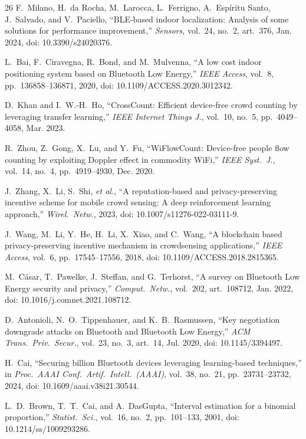 \documentclass[journal,10pt]{IEEEtran}
\begin{document}
\begin{thebibliography}{26}
 F.~Milano, H.~da Rocha, M.~Larocca, L.~Ferrigno,
A.~Esp\'iritu Santo, J.~Salvado, and V.~Paciello, ``BLE-based indoor
localization: Analysis of some solutions for performance improvement,''
\emph{Sensors}, vol.~24, no.~2, art.~376, Jan. 2024, doi: 10.3390/s24020376.

 L.~Bai, F.~Ciravegna, R.~Bond, and M.~Mulvenna, ``A low cost
indoor positioning system based on Bluetooth Low Energy,'' \emph{IEEE Access},
vol.~8, pp.~136858--136871, 2020, doi: 10.1109/ACCESS.2020.3012342.

 D.~Khan and I.~W.-H.~Ho, ``CrossCount: Efficient device-free
crowd counting by leveraging transfer learning,'' \emph{IEEE Internet Things
J.}, vol.~10, no.~5, pp.~4049--4058, Mar. 2023.

 R.~Zhou, Z.~Gong, X.~Lu, and Y.~Fu, ``WiFlowCount:
Device-free people flow counting by exploiting Doppler effect in commodity
WiFi,'' \emph{IEEE Syst.\ J.}, vol.~14, no.~4, pp.~4919--4930, Dec. 2020.

 J.~Zhang, X.~Li, S.~Shi, \emph{et al.}, ``A reputation-based
and privacy-preserving incentive scheme for mobile crowd sensing: A deep
reinforcement learning approach,'' \emph{Wirel.\ Netw.}, 2023, doi:
10.1007/s11276-022-03111-9.

 J.~Wang, M.~Li, Y.~He, H.~Li, X.~Xiao, and C.~Wang, ``A
blockchain based privacy-preserving incentive mechanism in crowdsensing
applications,'' \emph{IEEE Access}, vol.~6, pp.~17545--17556, 2018, doi:
10.1109/ACCESS.2018.2815365.

 M.~C\"asar, T.~Pawelke, J.~Steffan, and G.~Terhorst, ``A
survey on Bluetooth Low Energy security and privacy,'' \emph{Comput.\ Netw.},
vol.~202, art.~108712, Jan. 2022, doi: 10.1016/j.comnet.2021.108712.

 D.~Antonioli, N.~O.~Tippenhauer, and K.~B.~Rasmussen,
``Key negotiation downgrade attacks on Bluetooth and Bluetooth Low Energy,''
\emph{ACM Trans.\ Priv.\ Secur.}, vol.~23, no.~3, art.~14, Jul. 2020, doi:
10.1145/3394497.

 H.~Cai, ``Securing billion Bluetooth devices leveraging
learning-based techniques,'' in \emph{Proc.\ AAAI Conf.\ Artif.\ Intell.\
(AAAI)}, vol.~38, no.~21, pp.~23731--23732, 2024, doi:
10.1609/aaai.v38i21.30544.

 L.~D.~Brown, T.~T.~Cai, and A.~DasGupta, ``Interval
estimation for a binomial proportion,'' \emph{Statist.\ Sci.}, vol.~16, no.~2,
pp.~101--133, 2001, doi: 10.1214/ss/1009293286.


\end{thebibliography}
\end{document}
